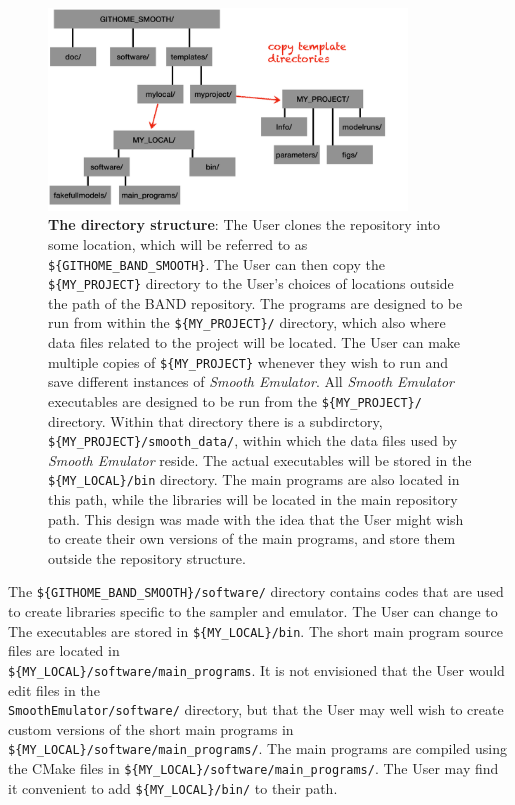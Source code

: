 \documentclass[UserManual.tex]{subfiles}
\begin{document}
\begin{figure}
\centerline{\includegraphics[width = 0.85\textwidth]{directorystructure}}
\caption{{\bf The directory structure}: The User clones the repository into some location, which will be referred to as {\tt \$\{\tt GITHOME\_BAND\_SMOOTH\}}. The User can then copy the {\tt  \$\{MY\_PROJECT\}} directory to the User's choices of locations outside the path of the BAND repository.  The programs are designed to be run from within the {\tt \$\{MY\_PROJECT\}/} directory, which also where data files related to the project will be located. The User can make multiple copies of {\tt  \$\{MY\_PROJECT\}} whenever they wish to run and save different instances of {\it Smooth Emulator}. All {\it Smooth Emulator} executables are designed to be run from the {\tt \$\{MY\_PROJECT\}/} directory. Within that directory there is a subdirctory, {\tt  \$\{MY\_PROJECT\}/smooth\_data/}, within which the data files used by {\it Smooth Emulator} reside. The actual executables will be stored in the {\tt  \$\{MY\_LOCAL\}/bin} directory. The main programs are also located in this path, while the libraries will be located in the main repository path. This design was made with the idea that the User might wish to create their own versions of the main programs, and store them outside the repository structure.
}
\end{figure}

The {\tt \$\{GITHOME\_BAND\_SMOOTH\}/software/} directory contains codes that are used to create libraries specific to the sampler and emulator. The User can change to The executables are stored in {\tt \$\{MY\_LOCAL\}/bin}. The short main program source files are located in\\{\tt \$\{MY\_LOCAL\}/software/main\_programs}. It is not envisioned that the User would edit files in the\\{\tt SmoothEmulator/software/} directory, but that the User may well wish to create custom versions of the short main programs in {\tt \$\{MY\_LOCAL\}/software/main\_programs/}. The main programs are compiled using the CMake files in {\tt \$\{MY\_LOCAL\}/software/main\_programs/}. The User may find it convenient to add {\tt \$\{MY\_LOCAL\}/bin/} to their path.
\end{document}
